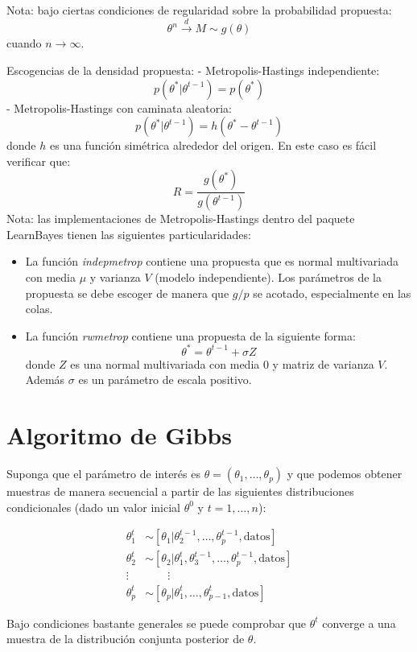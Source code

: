 \documentclass[
  12pt,
]{book}
\begin{document}
Nota: bajo ciertas condiciones de regularidad sobre la probabilidad
propuesta: \[\theta^n \stackrel{d}{\longrightarrow} M\sim g(\theta)\]
cuando \(n\rightarrow \infty\).

Escogencias de la densidad propuesta: - Metropolis-Hastings
independiente: \[p(\theta^*|\theta^{t-1})=p(\theta^*)\] -
Metropolis-Hastings con caminata aleatoria:
\[p(\theta^*|\theta^{t-1})=h(\theta^*-\theta^{t-1})\] donde \(h\) es una
función simétrica alrededor del origen. En este caso es fácil verificar
que: \[R=\frac{g(\theta^*)}{g(\theta^{t-1})}\] Nota: las
implementaciones de Metropolis-Hastings dentro del paquete LearnBayes
tienen las siguientes particularidades:

\begin{itemize}
\item
  La función \emph{indepmetrop} contiene una propuesta que es normal
  multivariada con media \(\mu\) y varianza \(V\) (modelo
  independiente). Los parámetros de la propuesta se debe escoger de
  manera que \(g/p\) se acotado, especialmente en las colas.
\item
  La función \emph{rwmetrop} contiene una propuesta de la siguiente
  forma: \[\theta^*=\theta^{t-1}+\sigma Z\] donde \(Z\) es una normal
  multivariada con media 0 y matriz de varianza \(V\). Además \(\sigma\)
  es un parámetro de escala positivo.
\end{itemize}

\hypertarget{algoritmo-de-gibbs}{%
\section{Algoritmo de Gibbs}\label{algoritmo-de-gibbs}}

Suponga que el parámetro de interés es
\(\theta=(\theta_1,\ldots,\theta_p)\) y que podemos obtener muestras de
manera secuencial a partir de las siguientes distribuciones
condicionales (dado un valor inicial \(\theta^0\) y \(t=1,\ldots,n\)):

\begin{align*}
\theta_1^t&\sim [\theta_1|\theta_2^{t-1},\ldots,\theta_p^{t-1},\text{datos}]\\
\theta_2^t&\sim [\theta_2|\theta_1^t,\theta_3^{t-1},\ldots,\theta_p^{t-1},\text{datos}]\\
\vdots & \qquad \vdots\\
\theta_p^t&\sim [\theta_p|\theta_1^t,\ldots,\theta_{p-1}^t,\text{datos}]
\end{align*}

Bajo condiciones bastante generales se puede comprobar que \(\theta^t\)
converge a una muestra de la distribución conjunta posterior de
\(\theta\).
\end{document}
